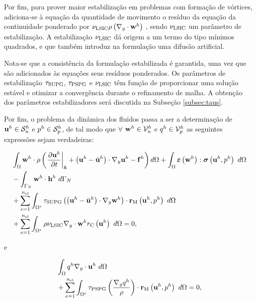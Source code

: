\documentclass[tese_patricia]{subfiles}%
\begin{document}
Por fim, para prover maior estabilização em problemas com formação de vórtices, adiciona-se à equação da quantidade de movimento o resíduo da equação da continuidade ponderado por $ \nu_{\mathrm{LSIC}} \rho \left(\nabla_y \cdot \mathbf{w}^h\right)$ \cite{TezduyarO:2000}, sendo $\nu_{\mathrm{LSIC}}$ um parâmetro de estabilização. A estabilização  $\nu_{\mathrm{LSIC}}$ dá origem a um termo do tipo mínimos quadrados, e que também introduz na formulação uma difusão artificial.

Nota-se que a consistência da formulação estabilizada é garantida, uma vez que são adicionados às equações seus resíduos ponderados. Os parâmetros de estabilização $\tau_{\mathrm{SUPG}}$, $\tau_{\mathrm{PSPG}}$ e $\nu_{\mathrm{LSIC}}$ têm função de proporcionar uma solução estável e otimizar a convergência durante o refinamento de malha. A obtenção dos parâmetros estabilizadores será discutida na Subseção \ref{subsec:taus}. 

Por fim, o problema da dinâmica dos fluidos passa a ser a determinação de $\mathbf{u}^h \in \mathcal{S}_u^h$ e $p^h \in \mathcal{S}_p^h$, de tal modo que $\forall$ $\mathbf{w}^h \in \mathcal{V}_u^h$ e $q^h \in \mathcal{V}_p^h$ as seguintes expressões sejam verdadeiras:

\begin{align}
\begin{split}
&\int_{\Omega} \mathbf{w}^h \cdot \rho\left(\left. \frac{\partial\mathbf{u}^h}{\partial t}\right|_{\bar{\mathbf{x}}}+ \left(\mathbf{u}^h - \bar{\mathbf{u}}^h \right) \cdot \nabla_y \mathbf{u}^h - \mathbf{f}^h\right) d\Omega +\int_{\Omega} \bm{\varepsilon} \left(\mathbf{w}^h\right) : \boldsymbol{\sigma} \left(\mathbf{u}^h,p^h\right)\ d\Omega\\ &
- \int_{\Gamma_N}\mathbf{w}^h \cdot \mathbf{h}^h\ d\Gamma_{N} \\ 
&+ \sum_{e=1}^{n_{\mathrm{el}}} \int_{\Omega^e} \tau_{\mathrm{SUPG}} \left(\left(\mathbf{u}^h - \bar{\mathbf{u}}^h \right) \cdot \nabla_y \mathbf{w}^h\right) \cdot \mathbf{r}_{\mathrm{M}}\left(\mathbf{u}^h,p^h \right)\  d\Omega\\
&+ \sum_{e=1}^{n_{\mathrm{el}}} \int_{\Omega^e} \rho \nu_{\mathrm{LSIC}} \nabla_y \cdot \mathbf{w}^h {r}_{\mathrm{C}}\left(\mathbf{u}^h\right)\  d\Omega = 0,
\label{eq:FinalSystem}
\end{split}
\end{align}

\noindent e

\begin{align}
	\begin{split}
	&\int_{\Omega}q^h \nabla_y \cdot \mathbf{u}^h \ d\Omega \\ 
	&+ \sum_{e=1}^{n_{\mathrm{el}}} \int_{\Omega^e} \tau_{\mathrm{PSPG}} \left(\frac{\nabla_y q^h}{\rho}\right) \cdot \mathbf{r}_{\mathrm{M}}\left(\mathbf{u}^h,p^h\right) \  d\Omega = 0,
	\label{eq:RC}
	\end{split}
	\end{align}
\end{document}
